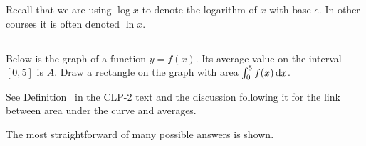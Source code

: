 %
%

Recall that we are using $\log x$ to denote the logarithm of $x$ with
base $e$. In other courses it is often denoted $\ln x$.

\subsection*{\Conceptual}


\begin{Mquestion}\label{prob_s2.2:avgvalue}
Below is the graph of a function $y=f(x)$. Its average value on the interval  $[0,5]$ is $A$. Draw a rectangle on the graph with area $\int_0^5 f(x)\,\mathrm{d}x$.
\begin{center}
\end{center}
\end{Mquestion}
\begin{hint}
See Definition~ in the CLP-2 text and the discussion following it for the link between area under the curve and averages.
\end{hint}
\begin{answer}
The most straightforward of many possible answers is shown.
\begin{center}
\end{center}
\end{answer}
